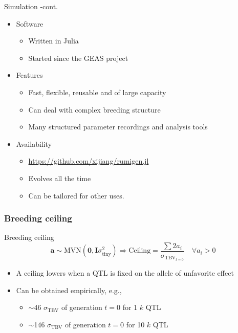 \documentclass{beamer}
\begin{document}
\begin{frame}{Simulation -cont.}
  \begin{itemize}
  \item Software
    \begin{itemize}
    \item Written in Julia
    \item Started since the GEAS project
    \end{itemize}
  \item Features
    \begin{itemize}
    \item Fast, flexible, reusable and of large capacity
    \item Can deal with complex breeding structure
    \item Many structured parameter recordings and analysis tools
    \end{itemize}
  \item Availability
    \begin{itemize}
    \item \href{https://github.com/xijiang/rumigen.jl}{https://github.com/xijiang/rumigen.jl}
    \item Evolves all the time
    \item Can be tailored for other uses.
    \end{itemize}
  \end{itemize}
\end{frame}

\subsubsection{Breeding ceiling}
\begin{frame}{Breeding ceiling}
  $$\mathbf{a}\sim\text{MVN}(\mathbf{0},\mathbf{I}\sigma_{\text{tiny}}^2)\Longrightarrow\text{Ceiling} = \frac{\sum 2a_i}{\sigma_{\text{TBV}_{t=0}}}\quad\forall a_i>0$$

  \begin{itemize}
  \item A ceiling lowers when a QTL is fixed on the allele of unfavorite effect
  \item Can be obtained empirically, e.g.,
    \begin{itemize}
    \item $\sim$\phantom{1}46 $\sigma_{\text{TBV}}$ of generation $t=0$ for \phantom{0}1 $k$ QTL
    \item $\sim$146 $\sigma_{\text{TBV}}$ of generation $t=0$ for 10 $k$ QTL
    \end{itemize}
  \end{itemize}
\end{frame}
\end{document}
